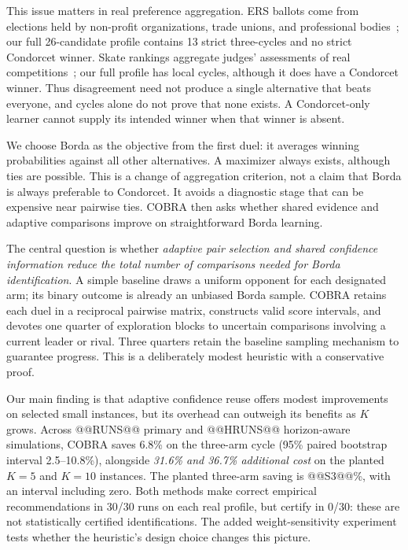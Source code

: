 \documentclass[11pt,a4paper]{article}
\begin{document}
This issue matters in real preference aggregation. ERS ballots come from elections held by non-profit organizations, trade unions, and professional bodies~\cite{ers}; our full 26-candidate profile contains 13 strict three-cycles and no strict Condorcet winner. Skate rankings aggregate judges' assessments of real competitions~\cite{skate}; our full profile has local cycles, although it does have a Condorcet winner. Thus disagreement need not produce a single alternative that beats everyone, and cycles alone do not prove that none exists. A Condorcet-only learner cannot supply its intended winner when that winner is absent.

We choose Borda as the objective from the first duel: it averages winning probabilities against all other alternatives. A maximizer always exists, although ties are possible. This is a change of aggregation criterion, not a claim that Borda is always preferable to Condorcet. It avoids a diagnostic stage that can be expensive near pairwise ties. COBRA then asks whether shared evidence and adaptive comparisons improve on straightforward Borda learning.

The central question is whether \emph{adaptive pair selection and shared confidence information reduce the total number of comparisons needed for Borda identification}. A simple baseline draws a uniform opponent for each designated arm; its binary outcome is already an unbiased Borda sample. COBRA retains each duel in a reciprocal pairwise matrix, constructs valid score intervals, and devotes one quarter of exploration blocks to uncertain comparisons involving a current leader or rival. Three quarters retain the baseline sampling mechanism to guarantee progress. This is a deliberately modest heuristic with a conservative proof.

Our main finding is that adaptive confidence reuse offers modest improvements on selected small instances, but its overhead can outweigh its benefits as $K$ grows. Across @@RUNS@@ primary and @@HRUNS@@ horizon-aware simulations, COBRA saves 6.8\% on the three-arm cycle (95\% paired bootstrap interval 2.5--10.8\%), alongside \emph{31.6\% and 36.7\% additional cost} on the planted $K=5$ and $K=10$ instances. The planted three-arm saving is @@S3@@\%, with an interval including zero. Both methods make correct empirical recommendations in 30/30 runs on each real profile, but certify in 0/30: these are not statistically certified identifications. The added weight-sensitivity experiment tests whether the heuristic's design choice changes this picture.
\end{document}
